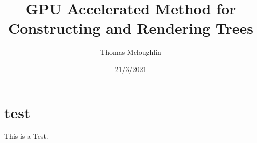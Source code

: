 \documentclass[final]{cmpreport}
\title{GPU Accelerated Method for Constructing and Rendering Trees}
\author{Thomas Mcloughlin}
\date{21/3/2021}
\begin{document}
\section{test}
This is a \citep{prusinkiewicz1996systems} Test.



\end{document}

